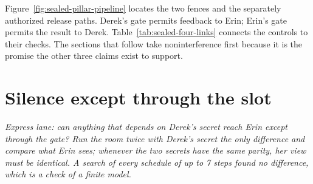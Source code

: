 \documentclass[11pt,a4paper]{article}
\theoremstyle{definition}
\begin{document}
Figure~\ref{fig:sealed-pillar-pipeline} locates the two fences and the
separately authorized release paths. Derek's gate permits feedback to Erin;
Erin's gate permits the result to Derek. Table~\ref{tab:sealed-four-links}
connects the controls to their checks. The sections that follow take noninterference
first because it is the promise the other three claims exist to support.



\ifdefined\pdreflectionplate{}\fi
\section{Silence except through the slot}\label{sec:sealed-noninterference}

\noindent\emph{Express lane: can anything that depends on Derek's secret
reach Erin except through the gate? Run the room twice with Derek's secret the
only difference and compare what Erin sees; whenever the two secrets have the
same parity, her view must be identical. A search of every schedule of up to 7
steps found no difference, which is a check of a finite model.}
\end{document}
